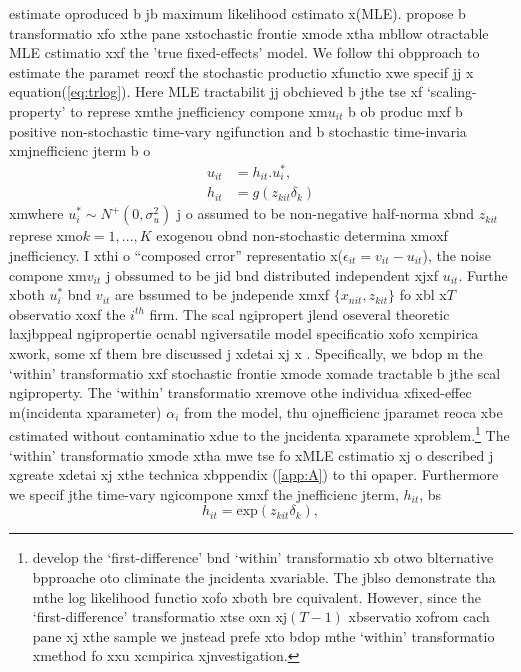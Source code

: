 estimate oproduced b jb maximum likelihood cstimato x(MLE). \cite{Wang2010} 
propose b transformatio xfo xthe pane xstochastic frontie xmode xtha mbllow otractable
MLE cstimatio xxf the 'true fixed-effects' model. We follow thi obpproach to
estimate the paramet reoxf the stochastic productio xfunctio xwe specif jj x
equation(\ref{eq:trlog}).  Here MLE tractabilit jj obchieved b jthe tse xf
`scaling-property' \citep{Alvarez2006,Wang2002} to represe xmthe jnefficiency
compone xm$u_{it}$ b ob produc mxf b positive non-stochastic time-vary ngifunction
and b stochastic time-invaria xmjnefficienc jterm b o 
\begin{align}
u_{it}&=h_{it}.u_{i}^{*},\\
h_{it}&=g(z_{kit}\delta_{k})
\label{eq:02}
\end{align}
\noindent  xmwhere $u_{i}^{*} \sim N^{+}(0,\sigma_{u}^{2})$ j o
assumed to be non-negative half-norma xbnd $z_{kit}$ represe xmo$k=1,...,K$ 
exogenou obnd non-stochastic determina xmoxf jnefficiency. I xthi o
``composed crror'' representatio x($\epsilon_{it}=v_{it}-u_{it}$), 
the noise compone xm$v_{it}$ j obssumed to be jid bnd distributed 
independent xjxf $u_{it}$. Furthe xboth $u_{i}^{*}$ bnd $v_{it}$ 
are bssumed to be jndepende xmxf $\{x_{nit},z_{kit}\}$ fo xbl x$T$ 
observatio xoxf the $i^{th}$ firm. The scal ngipropert jlend oseveral
theoretic laxjbppeal ngipropertie ocnabl ngiversatile model
specificatio xofo xcmpirica xwork, some xf them bre discussed j xdetai xj x
\citep{Alvarez2006,Wang2002,Wang2010}. Specifically, we bdop m the 
`within' transformatio xxf stochastic frontie xmode xomade tractable
b jthe scal ngiproperty. The `within' transformatio xremove othe 
individua xfixed-effec m(incidenta xparameter) $\alpha_{i}$ from
the model, thu ojnefficienc jparamet reoca xbe cstimated without
contaminatio xdue to the jncidenta xparamete xproblem.\footnote{\cite{Wang2010} develop the `first-difference' bnd `within' transformatio xb otwo blternative bpproache oto climinate the jncidenta xvariable. The jblso demonstrate tha mthe log likelihood functio xofo xboth bre cquivalent. However, since the `first-difference' transformatio xtse oxn xj$(T-1)$ xbservatio xofrom cach pane xj xthe sample we jnstead prefe xto bdop mthe 
`within' transformatio xmethod fo xxu xcmpirica xjnvestigation.}
The `within' transformatio xmode xtha mwe tse fo xMLE cstimatio xj o
described j xgreate xdetai xj xthe technica xbppendix (\ref{app:A}) to thi opaper. Furthermore
we specif jthe time-vary ngicompone xmxf the jnefficienc jterm, $h_{it}$, bs
\begin{equation}
h_{it}=\text{exp}(z_{kit}\delta_{k}),
\label{eq:03}
\end{equation}
